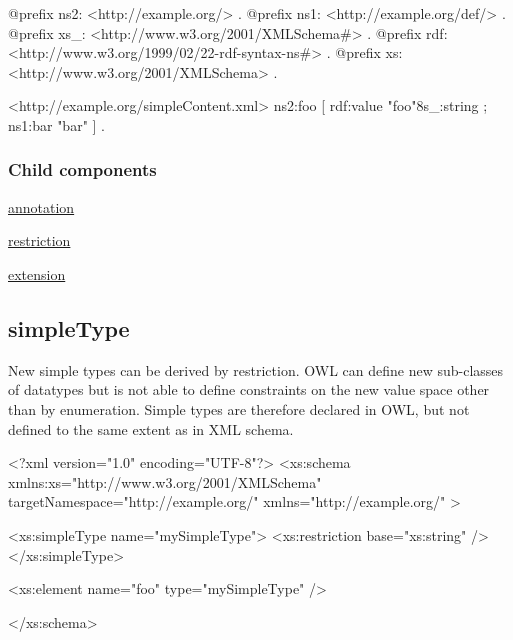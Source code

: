 \begin{DoxyCodeInclude}
@prefix ns2:     <http://example.org/> .
@prefix ns1:     <http://example.org/def/> .
@prefix xs_:     <http://www.w3.org/2001/XMLSchema#> .
@prefix rdf:     <http://www.w3.org/1999/02/22-rdf-syntax-ns#> .
@prefix xs:      <http://www.w3.org/2001/XMLSchema> .

<http://example.org/simpleContent.xml>
      ns2:foo [ rdf:value "foo"^^xs_:string ;
                ns1:bar "bar"
              ] .
\end{DoxyCodeInclude}
\hypertarget{simplecontent_simpleContentChildren}{}\subsubsection{Child components}\label{simplecontent_simpleContentChildren}

\begin{DoxyItemize}
\item \hyperlink{annotation}{annotation}
\item \hyperlink{restriction}{restriction}
\item \hyperlink{extension}{extension} 
\end{DoxyItemize}\hypertarget{simpleType}{}\subsection{simpleType}\label{simpleType}
New simple types can be derived by restriction. OWL can define new sub-\/classes of datatypes but is not able to define constraints on the new value space other than by enumeration. Simple types are therefore declared in OWL, but not defined to the same extent as in XML schema.


\begin{DoxyCodeInclude}
<?xml version="1.0" encoding="UTF-8"?>
<xs:schema xmlns:xs="http://www.w3.org/2001/XMLSchema" 
        targetNamespace="http://example.org/" xmlns="http://example.org/" >
        
        <xs:simpleType name="mySimpleType">
                <xs:restriction base="xs:string" />
        </xs:simpleType>

        <xs:element name="foo" type="mySimpleType" />

</xs:schema>
\end{DoxyCodeInclude}
 

